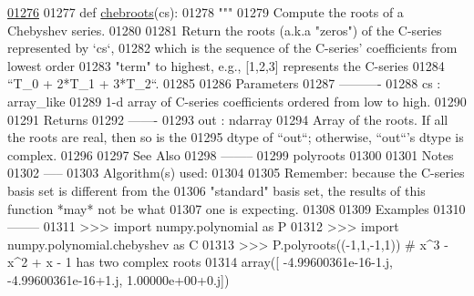 \begin{DoxyCode}
\hypertarget{namespacepyneb_1_1utils_1_1chebyshev_l01276}{}\hyperlink{namespacepyneb_1_1utils_1_1chebyshev_a63ef136648aeceebc5b0a0cfce98d49a}{01276} 
01277 \textcolor{keyword}{def }\hyperlink{namespacepyneb_1_1utils_1_1chebyshev_a63ef136648aeceebc5b0a0cfce98d49a}{chebroots}(cs):
01278     \textcolor{stringliteral}{"""}
01279 \textcolor{stringliteral}{    Compute the roots of a Chebyshev series.}
01280 \textcolor{stringliteral}{}
01281 \textcolor{stringliteral}{    Return the roots (a.k.a "zeros") of the C-series represented by `cs`,}
01282 \textcolor{stringliteral}{    which is the sequence of the C-series' coefficients from lowest order}
01283 \textcolor{stringliteral}{    "term" to highest, e.g., [1,2,3] represents the C-series}
01284 \textcolor{stringliteral}{    ``T\_0 + 2*T\_1 + 3*T\_2``.}
01285 \textcolor{stringliteral}{}
01286 \textcolor{stringliteral}{    Parameters}
01287 \textcolor{stringliteral}{    ----------}
01288 \textcolor{stringliteral}{    cs : array\_like}
01289 \textcolor{stringliteral}{        1-d array of C-series coefficients ordered from low to high.}
01290 \textcolor{stringliteral}{}
01291 \textcolor{stringliteral}{    Returns}
01292 \textcolor{stringliteral}{    -------}
01293 \textcolor{stringliteral}{    out : ndarray}
01294 \textcolor{stringliteral}{        Array of the roots.  If all the roots are real, then so is the}
01295 \textcolor{stringliteral}{        dtype of ``out``; otherwise, ``out``'s dtype is complex.}
01296 \textcolor{stringliteral}{}
01297 \textcolor{stringliteral}{    See Also}
01298 \textcolor{stringliteral}{    --------}
01299 \textcolor{stringliteral}{    polyroots}
01300 \textcolor{stringliteral}{}
01301 \textcolor{stringliteral}{    Notes}
01302 \textcolor{stringliteral}{    -----}
01303 \textcolor{stringliteral}{    Algorithm(s) used:}
01304 \textcolor{stringliteral}{}
01305 \textcolor{stringliteral}{    Remember: because the C-series basis set is different from the}
01306 \textcolor{stringliteral}{    "standard" basis set, the results of this function *may* not be what}
01307 \textcolor{stringliteral}{    one is expecting.}
01308 \textcolor{stringliteral}{}
01309 \textcolor{stringliteral}{    Examples}
01310 \textcolor{stringliteral}{    --------}
01311 \textcolor{stringliteral}{    >>> import numpy.polynomial as P}
01312 \textcolor{stringliteral}{    >>> import numpy.polynomial.chebyshev as C}
01313 \textcolor{stringliteral}{    >>> P.polyroots((-1,1,-1,1)) # x^3 - x^2 + x - 1 has two complex roots}
01314 \textcolor{stringliteral}{    array([ -4.99600361e-16-1.j,  -4.99600361e-16+1.j,   1.00000e+00+0.j])}

\end{DoxyCode}

